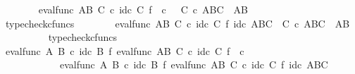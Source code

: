 \begin{isabellebody}
\ \ \ \ \ \ \isamarkupfalse%
\ {\isachardoublequoteopen}eval{\isacharunderscore}{\kern0pt}func\ {\isacharparenleft}{\kern0pt}A\isactrlbsup B\isactrlesup {\isacharparenright}{\kern0pt}\ C\ {\isasymcirc}\isactrlsub c\ id\isactrlsub c\ C\ {\isasymtimes}\isactrlsub f\ {\isasymphi}\isactrlsup {\isasymsharp}\isactrlsup {\isasymsharp}\ {\isasymcirc}\isactrlsub c\ {\isasympsi}\isactrlsup {\isasymsharp}\ {\isacharcolon}{\kern0pt}\ C\ {\isasymtimes}\isactrlsub c\ A\isactrlbsup B\isactrlesup \isactrlbsup C\isactrlesup \ {\isasymrightarrow}\ A\isactrlbsup B\isactrlesup {\isachardoublequoteclose}\isanewline
\ \ \ \ \ \ \ \ \isamarkupfalse%
\ typecheck{\isacharunderscore}{\kern0pt}cfuncs\isanewline
\ \ \ \ \ \ \isamarkupfalse%
\ {\isachardoublequoteopen}eval{\isacharunderscore}{\kern0pt}func\ {\isacharparenleft}{\kern0pt}A\isactrlbsup B\isactrlesup {\isacharparenright}{\kern0pt}\ C\ {\isasymcirc}\isactrlsub c\ id\isactrlsub c\ C\ {\isasymtimes}\isactrlsub f\ id\isactrlsub c\ {\isacharparenleft}{\kern0pt}A\isactrlbsup B\isactrlesup \isactrlbsup C\isactrlesup {\isacharparenright}{\kern0pt}\ {\isacharcolon}{\kern0pt}\ C\ {\isasymtimes}\isactrlsub c\ A\isactrlbsup B\isactrlesup \isactrlbsup C\isactrlesup \ {\isasymrightarrow}\ A\isactrlbsup B\isactrlesup {\isachardoublequoteclose}\isanewline
\ \ \ \ \ \ \ \ \isamarkupfalse%
\ typecheck{\isacharunderscore}{\kern0pt}cfuncs\isanewline
\ \ \ \ \ \ \isamarkupfalse%
\ {\isachardoublequoteopen}eval{\isacharunderscore}{\kern0pt}func\ A\ B\ {\isasymcirc}\isactrlsub c\ id\isactrlsub c\ B\ {\isasymtimes}\isactrlsub f\ {\isacharparenleft}{\kern0pt}eval{\isacharunderscore}{\kern0pt}func\ {\isacharparenleft}{\kern0pt}A\isactrlbsup B\isactrlesup {\isacharparenright}{\kern0pt}\ C\ {\isasymcirc}\isactrlsub c\ {\isacharparenleft}{\kern0pt}id\isactrlsub c\ C\ {\isasymtimes}\isactrlsub f\ {\isasymphi}\isactrlsup {\isasymsharp}\isactrlsup {\isasymsharp}\ {\isasymcirc}\isactrlsub c\ {\isasympsi}\isactrlsup {\isasymsharp}{\isacharparenright}{\kern0pt}{\isacharparenright}{\kern0pt}\ {\isacharequal}{\kern0pt}\isanewline
\ \ \ \ \ \ \ \ \ \ \ \ eval{\isacharunderscore}{\kern0pt}func\ A\ B\ {\isasymcirc}\isactrlsub c\ id\isactrlsub c\ B\ {\isasymtimes}\isactrlsub f\ eval{\isacharunderscore}{\kern0pt}func\ {\isacharparenleft}{\kern0pt}A\isactrlbsup B\isactrlesup {\isacharparenright}{\kern0pt}\ C\ {\isasymcirc}\isactrlsub c\ id\isactrlsub c\ C\ {\isasymtimes}\isactrlsub f\ id\isactrlsub c\ {\isacharparenleft}{\kern0pt}A\isactrlbsup B\isactrlesup \isactrlbsup C\isactrlesup {\isacharparenright}{\kern0pt}{\isachardoublequoteclose}\isanewline

\end{isabellebody}
